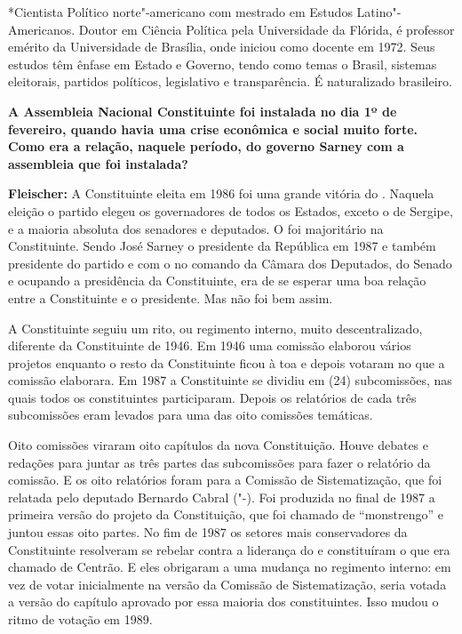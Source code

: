 *Cientista Político norte"-americano com mestrado em Estudos
Latino"-Americanos. Doutor em Ciência Política pela Universidade da
Flórida, é professor emérito da Universidade de Brasília, onde iniciou
como docente em 1972. Seus estudos têm ênfase em Estado e Governo, tendo
como temas o Brasil, sistemas eleitorais, partidos políticos,
legislativo e transparência. É naturalizado brasileiro.

\textbf{A Assembleia Nacional Constituinte foi instalada no dia 1º de
fevereiro, quando havia uma crise econômica e social muito forte. Como
era a relação, naquele período, do governo Sarney com a assembleia que
foi instalada?}

\textbf{Fleischer:} A Constituinte eleita em 1986 foi uma grande vitória
do . Naquela eleição o partido elegeu os governadores de todos os
Estados, exceto o de Sergipe, e a maioria absoluta dos senadores e
deputados. O  foi majoritário na Constituinte. Sendo José Sarney o
presidente da República em 1987 e também presidente do partido e com o
 no comando da Câmara dos Deputados, do Senado e ocupando a
presidência da Constituinte, era de se esperar uma boa relação entre a
Constituinte e o presidente. Mas não foi bem assim.

A Constituinte seguiu um rito, ou regimento interno, muito
descentralizado, diferente da Constituinte de 1946. Em 1946 uma comissão
elaborou vários projetos enquanto o resto da Constituinte ficou à toa e
depois votaram no que a comissão elaborara. Em 1987 a Constituinte se
dividiu em (24) subcomissões, nas quais todos os constituintes
participaram. Depois os relatórios de cada três subcomissões eram
levados para uma das oito comissões temáticas.

Oito comissões viraram oito capítulos da nova Constituição. Houve
debates e redações para juntar as três partes das subcomissões para
fazer o relatório da comissão. E os oito relatórios foram para a
Comissão de Sistematização, que foi relatada pelo deputado Bernardo
Cabral ("-). Foi produzida no final de 1987 a primeira versão do
projeto da Constituição, que foi chamado de ``monstrengo'' e juntou
essas oito partes. No fim de 1987 os setores mais conservadores da
Constituinte resolveram se rebelar contra a liderança do  e
constituíram o que era chamado de Centrão. E eles obrigaram a uma
mudança no regimento interno: em vez de votar inicialmente na versão da
Comissão de Sistematização, seria votada a versão do capítulo aprovado
por essa maioria dos constituintes. Isso mudou o ritmo de votação em
1989.

